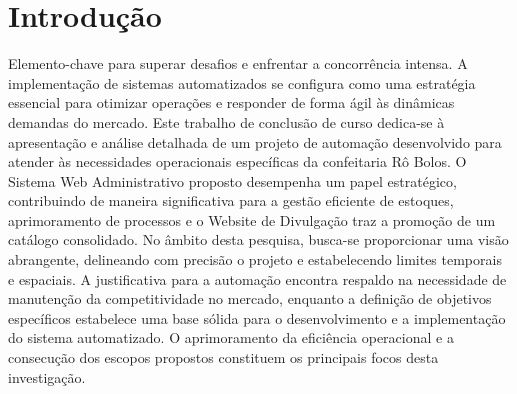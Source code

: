 \chapter{Introdução}

Elemento-chave para superar desafios e enfrentar a concorrência intensa.
A implementação de sistemas automatizados se configura como uma estratégia
essencial para otimizar operações e responder de forma ágil às dinâmicas
demandas do mercado.
Este trabalho de conclusão de curso dedica-se à apresentação e análise
detalhada de um projeto de automação desenvolvido para atender às
necessidades operacionais específicas da confeitaria Rô Bolos. O Sistema Web
Administrativo proposto desempenha um papel estratégico, contribuindo de
maneira significativa para a gestão eficiente de estoques, aprimoramento de
processos e o Website de Divulgação traz a promoção de um catálogo
consolidado.
No âmbito desta pesquisa, busca-se proporcionar uma visão abrangente,
delineando com precisão o projeto e estabelecendo limites temporais e
espaciais. A justificativa para a automação encontra respaldo na necessidade de
manutenção da competitividade no mercado, enquanto a definição de objetivos
específicos estabelece uma base sólida para o desenvolvimento e a
implementação do sistema automatizado. O aprimoramento da eficiência
operacional e a consecução dos escopos propostos constituem os principais
focos desta investigação. \cite{de2011associaccao}